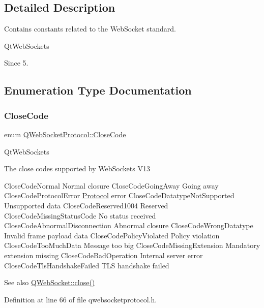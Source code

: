 \subsection{Detailed Description}
Contains constants related to the Web\+Socket standard. 

Qt\+Web\+Sockets \begin{DoxySince}{Since}
5. 
\end{DoxySince}


\subsection{Enumeration Type Documentation}
\mbox{\label{namespace_q_web_socket_protocol_a9f236676f594451d8d723f260b71028c}} 
\subsubsection{\texorpdfstring{Close\+Code}{CloseCode}}
{\footnotesize\ttfamily enum \mbox{\hyperlink{namespace_q_web_socket_protocol_a9f236676f594451d8d723f260b71028c}{Q\+Web\+Socket\+Protocol\+::\+Close\+Code}}}

Qt\+Web\+Sockets

The close codes supported by Web\+Sockets V13

Close\+Code\+Normal Normal closure  Close\+Code\+Going\+Away Going away  Close\+Code\+Protocol\+Error \mbox{\hyperlink{struct_protocol}{Protocol}} error  Close\+Code\+Datatype\+Not\+Supported Unsupported data  Close\+Code\+Reserved1004 Reserved  Close\+Code\+Missing\+Status\+Code No status received  Close\+Code\+Abnormal\+Disconnection Abnormal closure  Close\+Code\+Wrong\+Datatype Invalid frame payload data  Close\+Code\+Policy\+Violated Policy violation  Close\+Code\+Too\+Much\+Data Message too big  Close\+Code\+Missing\+Extension Mandatory extension missing  Close\+Code\+Bad\+Operation Internal server error  Close\+Code\+Tls\+Handshake\+Failed T\+LS handshake failed

\begin{DoxySeeAlso}{See also}
\mbox{\hyperlink{class_q_web_socket_ae1c9af16e7f53666ccd423864b8e2c35}{Q\+Web\+Socket\+::close()}} 
\end{DoxySeeAlso}


Definition at line 66 of file qwebsocketprotocol.\+h.

